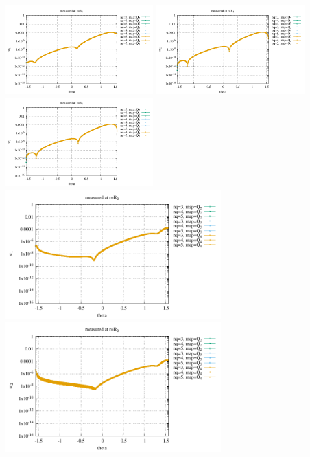 \begin{center}
\includegraphics[width=5.7cm]{python_codes/fieldstone_152/results/exp2_axisymmetric/sr1_R1}
\includegraphics[width=5.7cm]{python_codes/fieldstone_152/results/exp2_axisymmetric/sr2_R1}
\includegraphics[width=5.7cm]{python_codes/fieldstone_152/results/exp2_axisymmetric/sr3_R1}\\
\includegraphics[width=8.3cm]{python_codes/fieldstone_152/results/exp2_axisymmetric/sr1_R2}
\includegraphics[width=8.3cm]{python_codes/fieldstone_152/results/exp2_axisymmetric/sr2_R2}\\

\end{center}

